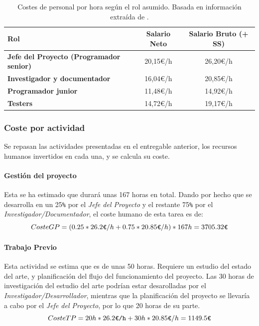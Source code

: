 \documentclass[11pt, letterpaper]{article}
\begin{document}
\begin{table}[H]
    \centering
    \begin{tabularx}{\textwidth}{X c c}
         \toprule
         \textbf{Rol} & \textbf{Salario Neto} & \textbf{Salario Bruto (+ SS)}\\
         \midrule
         \textbf{Jefe del Proyecto (Programador senior)} & 20,15€/h & 26,20€/h \\
         \textbf{Investigador y documentador} & 16,04€/h & 20,85€/h \\
         \textbf{Programador junior} & 11,48€/h & 14,92€/h \\
         \textbf{Testers} & 14,72€/h & 19,17€/h \\
         \bottomrule
    \end{tabularx}
    \caption{Costes de personal por hora según el rol asumido. Basada en información extraída de \cite{indeed_salarios}.}
    \label{tab:costes_personal}
\end{table}

\subsubsection{Coste por actividad}
\label{sec:coste_actividad}
Se repasan las actividades presentadas en el entregable anterior, los recursos humanos invertidos en cada una, y se calcula su coste.
\paragraph{Gestión del proyecto}
\label{sec:coste_gp}
Esta se ha estimado que durará unas 167 horas en total. Dando por hecho que se desarrolla en un 25\verb|%| por el \textit{Jefe del Proyecto} y el restante 75\verb|%| por el \textit{Investigador/Documentador}, el coste humano de esta tarea es de: 
\begin{equation}
\centering
Coste GP = (0{.}25*26{.}2 \verb|€|/h + 0{.}75*20{.}85 \verb|€|/h)*167h = 3705{.}32\verb|€|
\end{equation}
\paragraph{Trabajo Previo}
\label{sec:coste_tp}
Esta actividad se estima que es de unas 50 horas. Requiere un estudio del estado del arte, y planificación del flujo del funcionamiento del proyecto. Las 30 horas de investigación del estudio del arte podrían estar desarolladas por el \textit{Investigador/Desarrollador}, mientras que la planificación del proyecto se llevaría a cabo por el \textit{Jefe del Proyecto}, por lo que 20 horas de su parte.
\begin{equation}
    Coste TP = 20h * 26{.}2\verb|€/h| + 30h * 20{.}85\verb|€|/h = 1149{.}5\verb|€|
\end{equation}
\end{document}
